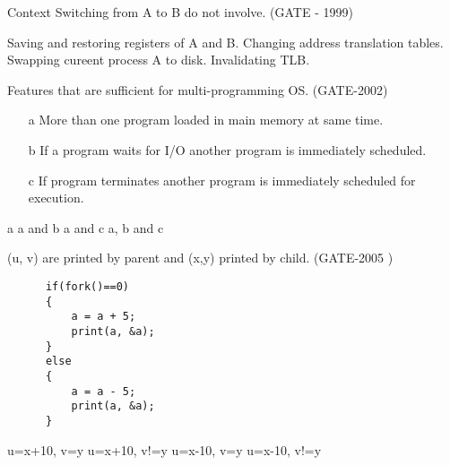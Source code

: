 \begin{minipage}{\linewidth}

  \question  Context Switching from A to B do not involve. (GATE - 1999)

  \begin{choices}
    \choice Saving and restoring registers of A and B.
    \choice Changing address translation tables.
    \choice Swapping cureent process A to disk.
    \choice Invalidating TLB.
  \end{choices}

\end{minipage}

\vspace{0.08in}


\begin{minipage}{\linewidth}

  \question  Features that are sufficient for multi-programming OS. (GATE-2002)

   \begin{enumerate}
      \item[a] More than one program loaded in main memory at same time.
      \item[b] If a program waits for I/O another program is immediately scheduled.
      \item[c] If program terminates another program is immediately scheduled for execution.
   \end{enumerate}

  \begin{oneparchoices}
    \choice a
    \choice a and b
    \choice a and c
    \choice a, b and c
  \end{oneparchoices}

\end{minipage}

\vspace{0.08in}


\begin{minipage}{\linewidth}

  \question  (u, v) are printed by parent and (x,y) printed by child. (GATE-2005 )

    \begin{lstlisting}
      if(fork()==0)
      {
          a = a + 5;
          print(a, &a);
      }
      else
      {
          a = a - 5;
          print(a, &a);
      }
    \end{lstlisting}

  \begin{oneparchoices}
    \choice u=x+10, v=y
    \choice u=x+10, v!=y
    \choice u=x-10, v=y
    \choice u=x-10, v!=y
  \end{oneparchoices}

  \end{minipage}

